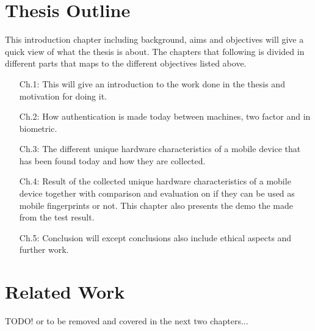 \section{Thesis Outline}\label{sec:outline}
This introduction chapter including background, aims and objectives will give a quick view of what the thesis is about. The chapters that following is divided in different parts that maps to the different objectives listed above.
\begin{itemize}
	\item[Ch.1: ]	This will give an introduction to the work done in the thesis and motivation for doing it.
	\item[Ch.2: ]	How authentication is made today between machines, two factor and in biometric.
	\item[Ch.3: ]	The different unique hardware characteristics of a mobile device that has been found today and how they are collected.
	\item[Ch.4: ]	Result of the collected unique hardware characteristics of a mobile device together with comparison and evaluation on if they can be used as mobile fingerprints or not. This chapter also presents the demo the made from the test result.
	\item[Ch.5: ]	Conclusion will except conclusions also include ethical aspects and further work. 
\end{itemize}


\section{Related Work}\label{sec:relatedWork}
TODO! or to be removed and covered in the next two chapters...